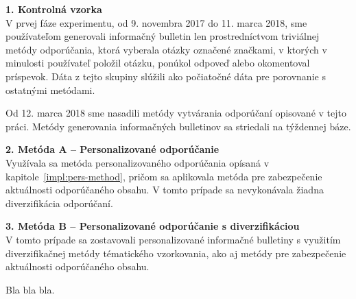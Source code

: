 \begin{adjustwidth}{1cm}{1cm}
\textbf{1. Kontrolná vzorka}\\
V prvej fáze experimentu, od 9. novembra 2017 do 11. marca 2018, sme používateľom generovali informačný bulletin len
prostredníctvom triviálnej metódy odporúčania, ktorá vyberala otázky označené značkami, v ktorých v minulosti používateľ
položil otázku, ponúkol odpoveď alebo okomentoval príspevok. Dáta z tejto skupiny slúžili ako počiatočné dáta pre porovnanie
s ostatnými metódami.

Od 12. marca 2018 sme nasadili metódy vytvárania odporúčaní opisované v tejto práci. Metódy generovania informačných bulletinov
sa striedali na týždennej báze.

\textbf{2. Metóda A -- Personalizované odporúčanie}\\
Využívala sa metóda personalizovaného odporúčania opísaná v kapitole~\ref{impl:pers-method}, pričom sa aplikovala
metóda pre zabezpečenie aktuálnosti odporúčaného obsahu. V tomto prípade sa nevykonávala žiadna diverzifikácia odporúčaní.

\textbf{3. Metóda B -- Personalizované odporúčanie s diverzifikáciou}\\
V tomto prípade sa zostavovali personalizované informačné bulletiny s využitím diverzifikačnej metódy tématického
vzorkovania, ako aj metódy pre zabezpečenie aktuálnosti odporúčaného obsahu.
\end{adjustwidth}

Bla bla bla.







